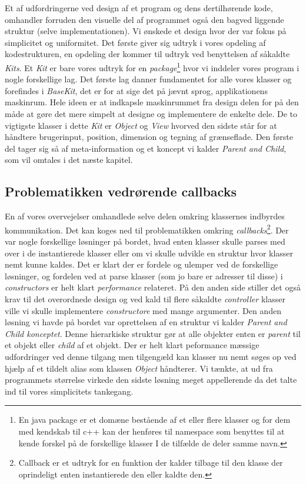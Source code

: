 \documentclass[]{article}
\begin{document}
Et af udfordringerne ved design af et program og dens dertilhørende kode, omhandler forruden den visuelle del af programmet også den bagved liggende struktur (selve implementationen). Vi ønskede et design hvor der var fokus på simplicitet og uniformitet. Det første giver sig udtryk i vores opdeling af kodestrukturen, en opdeling der kommer til udtryk ved benyttelsen af såkaldte \textit{Kits}. Et \textit{Kit} er bare vores udtryk for en \textit{package}\footnote{En java package er et domæne bestående af et eller flere klasser og for dem med kendskab til c++ kan der henføres til namespace som benyttes til at kende forskel på de forskellige klasser I de tilfælde de deler samme navn.} hvor vi inddeler vores program i nogle forskellige lag. Det første lag danner fundamentet for alle vores klasser og forefindes i \textit{BaseKit}, det er for at sige det på jævnt sprog, applikationens maskinrum. Hele ideen er at indkapsle maskinrummet fra design delen for på den måde at gøre det mere simpelt at designe og implementere de enkelte dele. De to vigtigste klasser i dette \textit{Kit} er \textit{Object} og \textit{View} hvorved den sidste står for at håndtere brugerinput, position, dimension og tegning af grænseflade. Den første del tager sig så af meta-information og et koncept vi kalder \textit{Parent and Child}, som vil omtales i det næste kapitel.
\subsection{Problematikken vedrørende callbacks}
En af vores overvejelser omhandlede selve delen omkring klassernes indbyrdes kommunikation. Det kan koges ned til problematikken omkring \textit{callbacks}\footnote{Callback er et udtryk for en funktion der kalder tilbage til den klasse der oprindeligt enten instantierede den eller kaldte den.}. Der var nogle forskellige løsninger på bordet, hvad enten klasser skulle parses med over i de instantierede klasser eller om vi skulle udvikle en struktur hvor klasser nemt kunne kaldes. Det er klart der er fordele og ulemper ved de forskellige løsninger, og fordelen ved at parse klasser (som jo bare er adresser til disse) i \textit{constructors} er helt klart \textit{performance} relateret. På den anden side stiller det også krav til det overordnede design og ved kald til flere såkaldte \textit{controller} klasser ville vi skulle implementere \textit{constructore} med mange argumenter. Den anden løsning vi havde på bordet var oprettelsen af en struktur vi kalder \textit{Parent and Child konceptet}. Denne hierarkiske struktur gør at alle objekter enten er \textit{parent} til et objekt eller \textit{child} af et objekt. Der er helt klart peformance mæssige udfordringer ved denne tilgang men tilgengæld kan klasser nu nemt søges op ved hjælp af et tildelt alias som klassen \textit{Object} håndterer. Vi tænkte, at ud fra programmets størrelse virkede den sidste løsning meget appellerende da det talte ind til vores simplicitets tankegang. 
\end{document}
